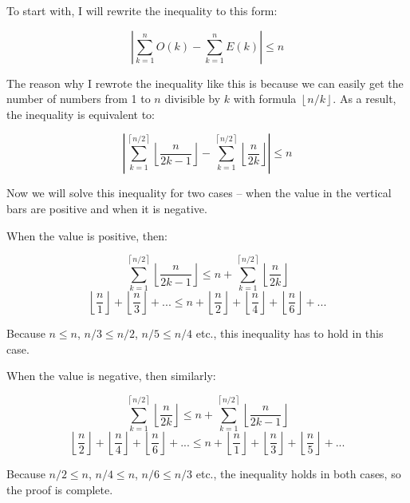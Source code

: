 \documentclass{fkssolpub}
\author{Ondřej Sedláček}
\begin{document}
To start with, I will rewrite the inequality to this form:

\[
	\left| \sum_{k = 1}^n O(k) - \sum_{k = 1}^n E(k) \right| \leq n
\]

The reason why I rewrote the inequality like this is because we
can easily get the number of numbers from 1 to $n$ divisible by $k$
with formula $\left\lfloor n/k \right\rfloor$. As a result,
the inequality is equivalent to:

\[
	\left| \sum_{k = 1}^{\left\lceil n/2 \right\rceil} \left\lfloor \frac{n}{2k - 1} \right\rfloor
	- \sum_{k = 1}^{\left\lceil n/2 \right\rceil} \left\lfloor \frac{n}{2k} \right\rfloor \right| \leq n
\]

Now we will solve this inequality for two cases -- when the value in the vertical bars
are positive and when it is negative.

When the value is positive, then:

\[
	\sum_{k = 1}^{\left\lceil n/2 \right\rceil} \left\lfloor \frac{n}{2k - 1} \right\rfloor
	\leq n + \sum_{k = 1}^{\left\lceil n/2 \right\rceil} \left\lfloor \frac{n}{2k} \right\rfloor
\]
\[
	\left\lfloor \frac{n}{1} \right\rfloor + \left\lfloor \frac{n}{3} \right\rfloor + ...
	\leq n + \left\lfloor \frac{n}{2} \right\rfloor + \left\lfloor \frac{n}{4} \right\rfloor
	+ \left\lfloor \frac{n}{6} \right\rfloor + ...
\]

Because $n \leq n$, $n/3 \leq n/2$, $n/5 \leq n/4$ etc., this inequality has to hold
in this case.

When the value is negative, then similarly:

\[
	\sum_{k = 1}^{\left\lceil n/2 \right\rceil} \left\lfloor \frac{n}{2k} \right\rfloor
	\leq n + \sum_{k = 1}^{\left\lceil n/2 \right\rceil} \left\lfloor \frac{n}{2k - 1} \right\rfloor
\]
\[
	\left\lfloor \frac{n}{2} \right\rfloor + \left\lfloor \frac{n}{4} \right\rfloor
	+ \left\lfloor \frac{n}{6} \right\rfloor + ...
	\leq n +
	\left\lfloor \frac{n}{1} \right\rfloor + \left\lfloor \frac{n}{3} \right\rfloor
	+ \left\lfloor \frac{n}{5} \right\rfloor+ ...
\]

Because $n/2 \leq n$, $n/4 \leq n$, $n/6 \leq n/3$ etc., the inequality holds in
both cases, so the proof is complete.
\end{document}

